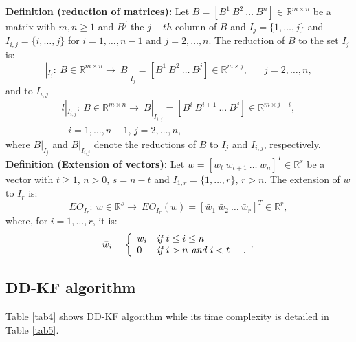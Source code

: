 \noindent \textbf{Definition (reduction of matrices):}
Let $B=[B^{1} \ B^{2} \ \ldots \ B^{n}] \in \mathbb{R}^{m \times n}$ be a matrix with $m,n\ge 1$ and $B^{j}$ the $j-th$ column of $B$ and $I_{j}=\{1,\ldots,j\}$ and $I_{i,j}=\{i,\ldots,j\}$ for $i=1,\ldots,n-1$ and $j=2,\ldots,n$. The reduction of $B$ to the set $I_{j}$ is:
\begin{equation}
|_{I_{j}}: \ B\in \mathbb{R}^{m\times n} \rightarrow \ B|_{ I_{j}}=[B^{1} \ B^{2} \ \ldots \ B^{j}]\in \mathbb{R}^{m \times j}, \quad \textit{ $j=2,\ldots,n$},
\end{equation}
and to $I_{i,j}$
\begin{eqnarray}{l}
|_{ I_{i,j}}: \ B\in \mathbb{R}^{m\times n} \rightarrow \ B|_{ I_{i,j}}=[B^{i} \ B^{i+1} \ \ldots \ B^{j}]\in \mathbb{R}^{m \times j-i},  \\ 
\textit{ $i=1,\ldots,n-1$, $j=2,\ldots,n$}, 
\end{eqnarray}
where $B|_{ I_{j}}$ and $B|_{ I_{i,j}}$ denote the reductions of  $B$ to $I_{j}$ and $I_{i,j}$, respectively.\\[.2cm]
\textbf{Definition (Extension  of vectors):}
Let $w=[w_{t} \ w_{t+1} \ \ldots \ w_{n}]^{T} \in \mathbb{R}^{s}$ be a vector with $t\ge 1$, $n>0$, $s=n-t$ and $I_{1,r}=\{1,\ldots,r\}$, $r>n$. The extension  of $w$  to  $I_{r}$ is:
\begin{equation}
EO_{I_{r}}: \ w\in \mathbb{R}^{s} \rightarrow \ EO_{I_{r}}(w)=[\bar{w}_{1} \ \bar{w}_{2} \ \ldots \ \bar{w}_{r}]^{T} \in \mathbb{R}^{r},
\end{equation}
where, for $i=1,\ldots,r$, it is: 
\begin{equation}
\bar{w}_{i} =\left\{ \begin{array}{ll} 
w_{i} & \textit{if $t\le i\le n$}\\
0 & \textit{if $i> n$ and $i<t$ \quad .}\\
\end{array}. \right.
\end{equation}





\subsection{DD-KF algorithm}
Table \ref{tab4} shows DD-KF algorithm while its time complexity is detailed in Table  \ref{tab5}.
 

